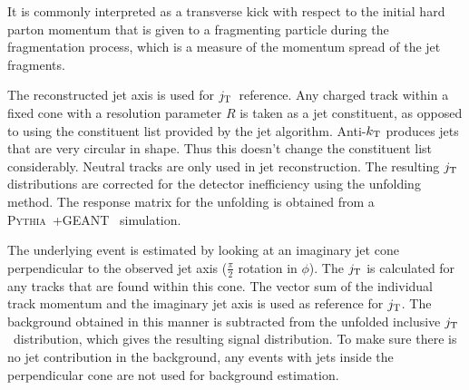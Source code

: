 It is commonly interpreted as a transverse kick with respect to the initial hard parton momentum that is given to a fragmenting particle during the fragmentation process, which is a measure of the momentum spread of the jet fragments.

The reconstructed jet axis is used for $j_{\rm T}$ reference. Any charged track within a fixed cone with a resolution parameter $R$ is taken as a jet constituent, as opposed to using the constituent list provided by the jet algorithm. Anti-$k_{\rm T}$ produces jets that are very circular in shape. Thus this doesn't change the constituent list considerably. Neutral tracks are only used in jet reconstruction.
The resulting $j_{\rm T}$ distributions are corrected for the detector inefficiency using the unfolding method. The response matrix for the unfolding is obtained from a \textsc{Pythia}~\cite{introPythia81}+GEANT~\cite{Agostinelli:2002hh,Asai:2015xno} simulation.


The underlying event is estimated by looking at an imaginary jet cone perpendicular to the observed jet axis ($\frac{\pi}{2}$ rotation in $\phi$). The $j_{\rm T}$ is calculated for any tracks that are found within this cone. The vector sum of the individual track momentum and the imaginary jet axis is used as reference for $j_{\rm T}$. The background obtained in this manner is subtracted from the unfolded inclusive $j_{\rm T}$ distribution, which gives the resulting signal distribution. To make sure there is no jet contribution in the background, any events with jets inside the perpendicular cone are not used for background estimation.



